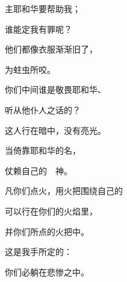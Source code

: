 {\par }{\Q {}主耶和华要帮助我；
\par }{\Q 谁能定我有罪呢？
\par }{\Q 他们都像衣服渐渐旧了，
\par }{\Q 为蛀虫所咬。
\par }{\BB \par }{\Q {}你们中间谁是敬畏耶和华、
\par }{\Q 听从他仆人之话的？
\par }{\Q 这人行在暗中，没有亮光。
\par }{\Q 当倚靠耶和华的名，
\par }{\Q 仗赖自己的　神。
\par }{\Q {}凡你们点火，用火把围绕自己的
\par }{\Q 可以行在你们的火焰里，
\par }{\Q 并你们所点的火把中。
\par }{\Q 这是我手所定的：
\par }{\Q 你们必躺在悲惨之中。

}
